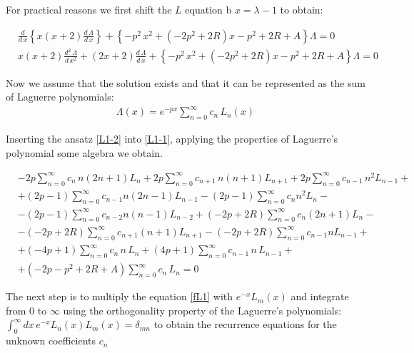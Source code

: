 For practical reasons we first shift the $ L $ equation b $ x = \lambda - 1 $ to obtain:

\begin{equation}\label{L1-1}
\begin{split}
& \frac{d}{d\,x}\left\{x(x+2)\frac{d\,\Lambda}{d\,x} \right\} + \left\{ - p^2\,x^2 + (-2p^2 + 2R) x  -p^2 + 2R + A \right\}\Lambda = 0 \\[.8em]
& x(x+2)\frac{d^2\,\Lambda}{d\,x^2} + (2x+2)\frac{d\,\Lambda}{d\,x} +  \left\{ - p^2\,x^2 + (-2p^2 + 2R) x  -p^2 + 2R + A \right\}\Lambda = 0
\end{split}
\end{equation}

Now we assume that  the solution exists and that it can be represented as the sum of Laguerre polynomials:
\begin{equation}\label{L1-2}
\begin{split}
\Lambda(x) = e^{-px}\sum_{n=0}^{\infty}{c_n\,L_n(x)}
\end{split}
\end{equation}

Inserting the ansatz \eqref{L1-2} into \eqref{L1-1}, applying the properties of Laguerre's polynomial some algebra we obtain. 

\begin{equation}\label{fL1}
\begin{split}
& -2p\sum_{n=0}^{\infty}{c_n\,n(2n+1)L_n}  + 2p\sum_{n=0}^{\infty}{c_{n+1}\,n(n+1)L_{n+1}}+2p\sum_{n=0}^{\infty}{c_{n-1}\,n^2L_{n-1}} + \\[.8em] 
& + (2p-1)\sum_{n=0}^{\infty}{c_{n-1}n(2n-1)L_{n-1}} - (2p-1)\sum_{n=0}^{\infty}{c_{n}n^2L_n}- \\[.8em]
& - (2p-1)\sum_{n=0}^{\infty}{c_{n-2}n(n-1)L_{n-2}} + (-2p+2R)\sum_{n=0}^{\infty}{c_n(2n+1)L_n} -  \\[.8em]
& - (-2p+2R)\sum_{n=0}^{\infty}{c_{n+1}(n+1)L_{n+1}} - (-2p+2R)\sum_{n=0}^{\infty}{c_{n-1}n L_{n-1}} + \\[.8em] 
& + (-4p + 1)\sum_{n=0}^{\infty}{c_n\,n\,L_n } + (4p+1)\sum_{n=0}^{\infty}{c_{n-1}\,n\,L_{n-1}}  +  \\[.8em]
& + (-2p - p^2 + 2R + A)\sum_{n=0}^{\infty}{c_n\,L_ n} = 0 
\end{split} 
\end{equation}

The next step is to multiply the equation \eqref{fL1} with $ e^{-x}L_m(x) $ and integrate from $ 0 $ to $ \infty $ using the orthogonality property of the Laguerre's polynomials: $ \int_0^{\infty}{dx\,e^{-x}L_n(x)L_m(x)} = \delta_{mn} $ to obtain the recurrence equations for the unknown coefficients $ c_n $

